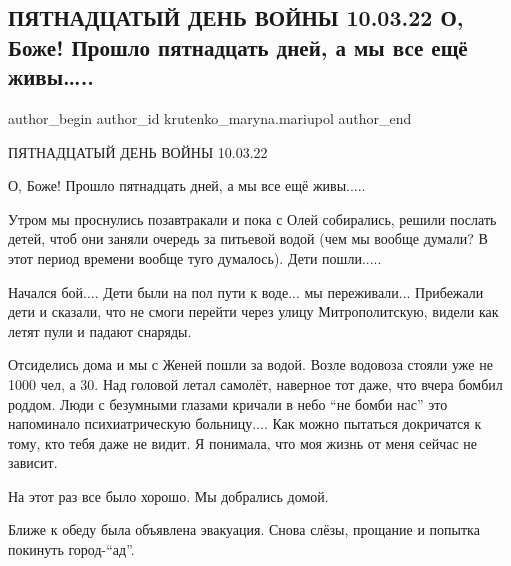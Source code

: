  
 
 
 
 

\subsection{ПЯТНАДЦАТЫЙ ДЕНЬ ВОЙНЫ 10.03.22 О, Боже! Прошло пятнадцать дней, а мы все ещё живы…..}
\label{sec:10_03_2023.fb.krutenko_maryna.mariupol.1.15_den_10_03_o_bozhe_my_vse_esche_zhyvy}

\ifcmt
 author_begin
   author_id krutenko_maryna.mariupol
 author_end
\fi

ПЯТНАДЦАТЫЙ ДЕНЬ ВОЙНЫ 10.03.22

О, Боже! Прошло пятнадцать дней, а мы все ещё живы.....

Утром мы проснулись позавтракали и пока с Олей собирались, решили послать
детей, чтоб они заняли очередь за питьевой водой (чем мы вообще думали? В этот
период времени вообще туго думалось). Дети пошли.....

Начался бой.... Дети были на пол пути к воде... мы переживали... Прибежали дети и
сказали, что не смоги перейти через улицу Митрополитскую, видели как летят пули
и падают снаряды. 

Отсиделись дома и мы с Женей пошли за водой. Возле водовоза стояли уже не 1000
чел, а 30. Над головой летал самолёт, наверное тот даже, что вчера бомбил
роддом. Люди с безумными глазами кричали в небо \enquote{не бомби нас} это напоминало
психиатрическую больницу.... Как можно пытаться докричатся к тому, кто тебя даже
не видит. Я понимала, что моя жизнь от меня сейчас не зависит. 

На этот раз все было хорошо. Мы добрались домой. 

Ближе к обеду была объявлена эвакуация. Снова слёзы, прощание и попытка
покинуть город-\enquote{ад}. 

